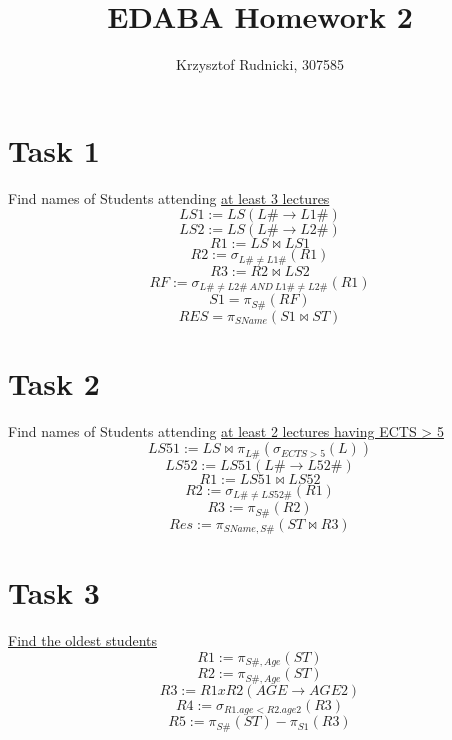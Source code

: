 \documentclass[12pt]{article}
\title{EDABA Homework 2}
\author{Krzysztof Rudnicki, 307585}
\begin{document}
\maketitle
\section{Task 1}
Find names of Students attending \underline{at least 3 lectures}
\[ LS1 := LS(L\# \rightarrow L1\#) \] 
\[ LS2 := LS(L\# \rightarrow L2\#) \] 
\[ R1 := LS \bowtie LS1 \]  
\[ R2 := \sigma_{L\# \neq L1\#} (R1) \] 
\[ R3 := R2 \bowtie LS2 \] 
\[ RF := \sigma_{L\# \neq L2\# \: AND \: L1\# \neq L2\#} (R1) \] 
\[ S1 = \pi_{S\#}(RF) \] 
\[ RES = \pi_{SName} (S1 \bowtie ST) \] 

\section{Task 2}
Find names of Students attending \underline{at least 2 lectures having ECTS > 5}
\[ LS51 := LS \bowtie \pi_{L\#}(\sigma_{ECTS>5}(L)) \] 
\[ LS52 := LS51(L\# \rightarrow L52\#) \] 
\[ R1 := LS51 \bowtie LS52 \]  
\[ R2 := \sigma_{L\# \neq LS52\#} (R1) \] 
\[ R3 := \pi_{S\#}(R2) \] 
\[ Res := \pi_{SName,S\#}(ST \bowtie R3) \] 

\section{Task 3}
\underline{Find the oldest students}
\[ R1 := \pi_{S\#, Age}(ST) \] 
\[ R2 := \pi_{S\#, Age}(ST) \] 
\[ R3 := R1xR2(AGE \rightarrow AGE2) \] 
\[ R4 := \sigma_{R1.age < R2.age2} (R3) \] 
\[ R5 := \pi_{S\#}(ST) - \pi_{S1}(R3) \] 
\end{document}
